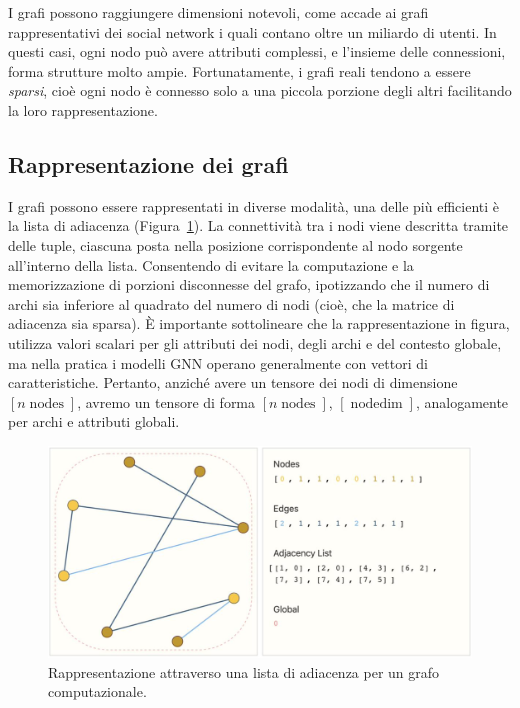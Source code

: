 I grafi possono raggiungere dimensioni notevoli, come accade ai grafi rappresentativi dei social network i quali contano oltre un miliardo di utenti. In questi casi, ogni nodo può avere attributi complessi, e l’insieme delle connessioni, forma strutture molto ampie. Fortunatamente, i grafi reali tendono a essere \textit{sparsi}, cioè ogni nodo è connesso solo a una piccola porzione degli altri facilitando la loro rappresentazione.

\subsection{Rappresentazione dei grafi}

I grafi possono essere rappresentati in diverse modalità, una delle più efficienti è la lista di adiacenza (Figura~\ref{fig:GraphComp}). La connettività tra i nodi viene descritta tramite delle tuple, ciascuna posta nella posizione corrispondente al nodo sorgente all'interno della lista. Consentendo di evitare la computazione e la memorizzazione di porzioni disconnesse del grafo, ipotizzando che il numero di archi sia inferiore al quadrato del numero di nodi (cioè, che la matrice di adiacenza sia sparsa). È importante sottolineare che la rappresentazione in figura, utilizza valori scalari per gli attributi dei nodi, degli archi e del contesto globale, ma nella pratica i modelli GNN operano generalmente con vettori di caratteristiche. Pertanto, anziché avere un tensore dei nodi di dimensione $[n \operatorname{nodes}]$, avremo un tensore di forma $[n \operatorname{nodes}]$, $[\operatorname{node dim}]$, analogamente per archi e attributi globali.

\begin{figure}
    \centering
    \includegraphics[width=\textwidth]{figure/ComputGraph.png}
    \caption{Rappresentazione attraverso una lista di adiacenza per un grafo computazionale.}
    \label{fig:GraphComp}
\end{figure}


